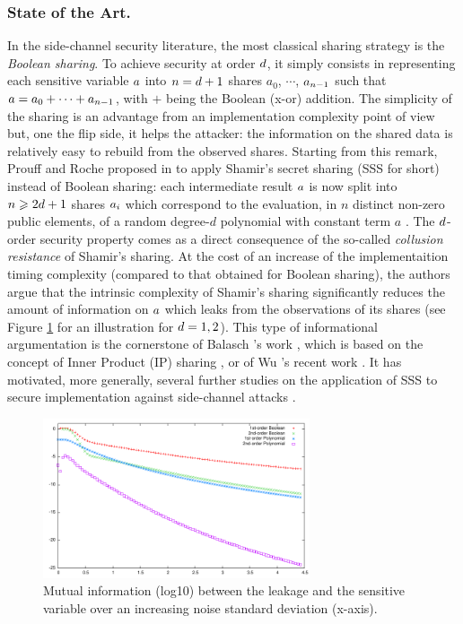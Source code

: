 \documentclass{llncs}
\begin{document}
\subsubsection{State of the Art.} In the side-channel security literature, the most classical sharing strategy is the {\em Boolean sharing}. To achieve security at order $d$, it simply consists in representing each sensitive variable $a$ into $n=d+1$ shares $a_0$, $\cdots$, $a_{n-1}$ such that $a=a_0 + \cdots + a_{n -1}$, with $+$ being the Boolean (x-or) addition. The simplicity of the sharing is an advantage from an implementation complexity point of view but, one the flip side, it helps the attacker: the information on the shared data is relatively  easy to rebuild from the observed shares. Starting from this remark, Prouff and Roche proposed in \cite{PR11} to apply Shamir's secret sharing (SSS for short) instead of Boolean sharing: each intermediate result $a$ is now split into $n\geqslant 2d +1$ shares $a_{i}$ which correspond to the evaluation, in $n$ distinct non-zero public elements, of a random degree-$d$ polynomial with constant term $a$ \cite{Sha79}. The $d$\th-order security property comes as a direct consequence of the so-called {\em collusion resistance} of Shamir's sharing. At the cost of an increase of the implementaition timing complexity (compared to that obtained for Boolean sharing), the authors argue that the intrinsic complexity of Shamir's sharing significantly reduces the amount of information on $a$ which leaks from the observations of its shares (see Figure \ref{fig:miBoolSSS} for an illustration for $d=1,2$). This type of informational argumentation is the cornerstone of Balasch \etal's work \cite{BFG15}, which is based on the concept of Inner Product (IP) sharing \cite{DF12}, or of Wu \etal's recent work \cite{WSYPJGG16}. It has motivated, more generally, several further studies on the application of SSS to secure implementation against side-channel attacks \cite{CPR12,CRZ13,GM11,GSF13,MM13}.

\begin{figure}
\begin{center}
\includegraphics[width=0.7\textwidth]{Figure/mutinf_comparizon.pdf}
\caption{Mutual information (log10) between the leakage and the sensitive variable over
an increasing noise standard deviation (x-axis).}
\label{fig:miBoolSSS}
\end{center}
\end{figure}
\end{document}
